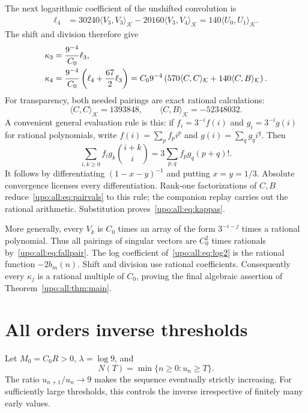 \documentclass[11pt,letterpaper]{article}
\theoremstyle{remark}\newtheorem{remark}[theorem]{Remark}
\numberwithin{equation}{section}
\newcommand{\fall}[2]{#1^{\underline{#2}}}
\newcommand{\pa}[2]{\langle #1,#2\rangle_{\mathcal K}}
\begin{document}
The next logarithmic coefficient of the unshifted convolution is
\begin{align*}
\ell_4&=30240\pa{V_3}{V_3}-20160\pa{V_3}{V_4}
       =140\pa{U_0}{U_1}.
\end{align*}
The shift and division therefore give
\begin{align}
\kappa_3&=\frac{9^{-4}}{C_0}\ell_3,
\notag\\
\kappa_4&=\frac{9^{-4}}{C_0}\left(\ell_4+\frac{67}{2}\ell_3\right)
 =C_0 9^{-4}\left(570\pa CC+140\pa CB\right).\label{upo:all:eq:kappa4}
\end{align}
For transparency, both needed pairings are exact rational calculations:
\begin{equation}\label{upo:all:eq:pairvals}
\pa CC=1393848,\qquad \pa CB=-52348032.
\end{equation}
A convenient general evaluation rule is this: if
$f_i=3^{-i}f(i)$ and $g_i=3^{-i}g(i)$ for rational polynomials, write
$f(i)=\sum_p f_p\fall ip$ and $g(i)=\sum_q g_q\fall iq$. Then
\begin{equation}\label{upo:all:eq:fallpair}
\sum_{i,k\ge0} f_i g_k\binom{i+k}{i}
 =3\sum_{p,q}f_pg_q(p+q)!.
\end{equation}
It follows by differentiating $(1-x-y)^{-1}$ and putting $x=y=1/3$.
Absolute convergence licenses every differentiation. Rank-one
factorizations of $C,B$ reduce~\eqref{upo:all:eq:pairvals} to this rule; the companion replay carries out the rational arithmetic. Substitution proves~\eqref{upo:all:eq:kappas}.

More generally, every $V_k$ is $C_0$ times an array of the form
$3^{-i-j}$ times a rational polynomial. Thus all pairings of singular
vectors are $C_0^2$ times rationals by~\eqref{upo:all:eq:fallpair}.
The log coefficient of~\eqref{upo:all:eq:log2} is the rational function
$-2b_m(n)$. Shift and division use rational coefficients. Consequently
every $\kappa_j$ is a rational multiple of $C_0$, proving the final
algebraic assertion of Theorem~\ref{upo:all:thm:main}.

\section{All orders inverse thresholds}\label{upo:all:sec:inverse}
Let $M_0=C_0R>0$, $\lambda=\log9$, and
\[
N(T)=\min\{n\ge0:u_n\ge T\}.
\]
The ratio $u_{n+1}/u_n\to9$ makes the sequence eventually strictly
increasing. For sufficiently large thresholds, this controls the
inverse irrespective of finitely many early values.
\end{document}
